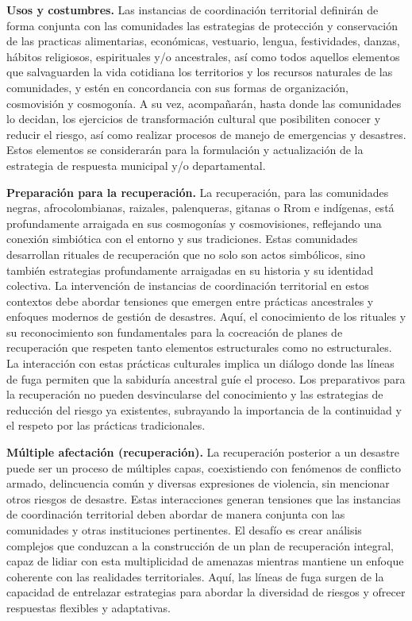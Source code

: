 \documentclass[
  spanish,
  letterpaper,
]{book}
\begin{document}
\textbf{Usos y costumbres.} Las instancias de coordinación territorial
definirán de forma conjunta con las comunidades las estrategias de
protección y conservación de las practicas alimentarias, económicas,
vestuario, lengua, festividades, danzas, hábitos religiosos,
espirituales y/o ancestrales, así como todos aquellos elementos que
salvaguarden la vida cotidiana los territorios y los recursos naturales
de las comunidades, y estén en concordancia con sus formas de
organización, cosmovisión y cosmogonía. A su vez, acompañarán, hasta
donde las comunidades lo decidan, los ejercicios de transformación
cultural que posibiliten conocer y reducir el riesgo, así como realizar
procesos de manejo de emergencias y desastres. Estos elementos se
considerarán para la formulación y actualización de la estrategia de
respuesta municipal y/o departamental.

\textbf{Preparación para la recuperación.} La recuperación, para las
comunidades negras, afrocolombianas, raizales, palenqueras, gitanas o
Rrom e indígenas, está profundamente arraigada en sus cosmogonías y
cosmovisiones, reflejando una conexión simbiótica con el entorno y sus
tradiciones. Estas comunidades desarrollan rituales de recuperación que
no solo son actos simbólicos, sino también estrategias profundamente
arraigadas en su historia y su identidad colectiva. La intervención de
instancias de coordinación territorial en estos contextos debe abordar
tensiones que emergen entre prácticas ancestrales y enfoques modernos de
gestión de desastres. Aquí, el conocimiento de los rituales y su
reconocimiento son fundamentales para la cocreación de planes de
recuperación que respeten tanto elementos estructurales como no
estructurales. La interacción con estas prácticas culturales implica un
diálogo donde las líneas de fuga permiten que la sabiduría ancestral
guíe el proceso. Los preparativos para la recuperación no pueden
desvincularse del conocimiento y las estrategias de reducción del riesgo
ya existentes, subrayando la importancia de la continuidad y el respeto
por las prácticas tradicionales.

\textbf{Múltiple afectación (recuperación).} La recuperación posterior a
un desastre puede ser un proceso de múltiples capas, coexistiendo con
fenómenos de conflicto armado, delincuencia común y diversas expresiones
de violencia, sin mencionar otros riesgos de desastre. Estas
interacciones generan tensiones que las instancias de coordinación
territorial deben abordar de manera conjunta con las comunidades y otras
instituciones pertinentes. El desafío es crear análisis complejos que
conduzcan a la construcción de un plan de recuperación integral, capaz
de lidiar con esta multiplicidad de amenazas mientras mantiene un
enfoque coherente con las realidades territoriales. Aquí, las líneas de
fuga surgen de la capacidad de entrelazar estrategias para abordar la
diversidad de riesgos y ofrecer respuestas flexibles y adaptativas.
\end{document}
